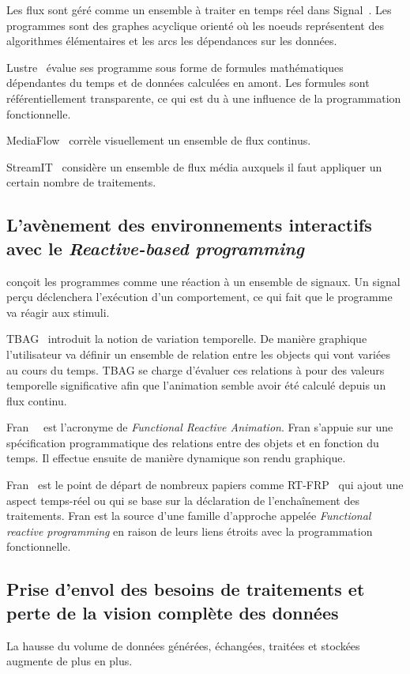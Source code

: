 \documentclass{llncs}
\newcommand{\RP}{\emph{Reactive-based programming} }
\newcommand{\FRP}{\emph{Functional reactive programming} }
\begin{document}
Les flux sont géré comme un ensemble à traiter en temps réel dans Signal~\cite{Benveniste85}.
Les programmes sont des graphes acyclique orienté où les noeuds représentent des
algorithmes élémentaires et les arcs les dépendances sur les données.

Lustre~\cite{Caspi87} évalue ses programme sous forme de formules mathématiques
dépendantes du temps et de données calculées en amont.
Les formules sont référentiellement transparente, ce qui est du à une influence
de la programmation fonctionnelle.

MediaFlow~\cite{Elliott95} corrèle visuellement un ensemble de flux continus.

StreamIT~\cite{Thies02} considère un ensemble de flux média auxquels il faut
appliquer un certain nombre de traitements.

\subsection{L'avènement des environnements interactifs avec le \RP}
\cite{Andre96} conçoit les programmes comme une réaction à un ensemble de
signaux. Un signal perçu déclenchera l'exécution d'un comportement, ce qui
fait que le programme va réagir aux stimuli.

TBAG~\cite{Elliott94} introduit la notion de variation temporelle.
De manière graphique l'utilisateur va définir un ensemble de relation
entre les objects qui vont variées au cours du temps.
TBAG se charge d'évaluer ces relations à pour des valeurs temporelle
significative afin que l'animation semble avoir été calculé depuis
un flux continu.

Fran~\cite{Elliott97}~\cite{Elliott98} est l'acronyme de \emph{Functional Reactive Animation}.
Fran s'appuie sur une spécification programmatique des relations entre des objets
et en fonction du temps.
Il effectue ensuite de manière dynamique son rendu graphique.

Fran~\cite{Elliott97} est le point de départ de nombreux papiers comme RT-FRP~\cite{Wan02}
qui ajout une aspect temps-réel ou \cite{Nilsson2002a} qui se base sur la déclaration
de l'enchaînement des traitements.
Fran est la source d'une famille d'approche appelée \FRP en raison de leurs liens
étroits avec la programmation fonctionnelle.

\subsection{Prise d'envol des besoins de traitements et perte de la vision complète des données}
La hausse du volume de données générées, échangées, traitées et stockées augmente de
plus en plus.
\end{document}
